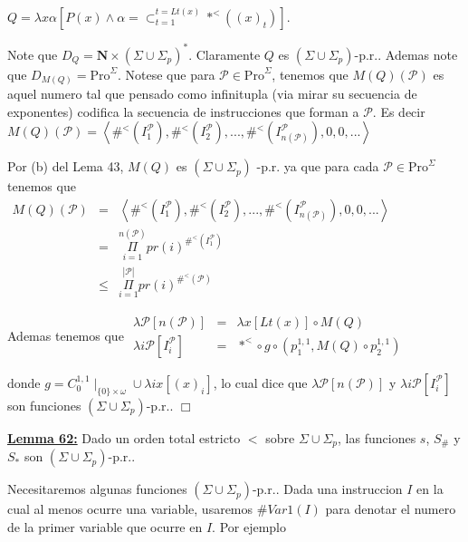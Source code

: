 \(\displaystyle Q=\lambda x\alpha \left[ P(x)\wedge \alpha =\subset _{t=1}^{t=Lt(x)}\ast ^{< }((x)_{t})\right] \text{.} \)

Note que \(D_{Q}=\mathbf{N}\times (\Sigma \cup \Sigma _{p})^{\ast }\). Claramente \(Q\) es \((\Sigma \cup \Sigma _{p})\)-p.r.. Ademas note que \( D_{M(Q)}=\mathrm{Pro}^{\Sigma }\). Notese que para \(\mathcal{P}\in \mathrm{Pro }^{\Sigma }\), tenemos que \(M(Q)(\mathcal{P})\) es aquel numero tal que pensado como infinitupla (via mirar su secuencia de exponentes) codifica la secuencia de instrucciones que forman a \(\mathcal{P}\). Es decir
\(\displaystyle M(Q)(\mathcal{P})=\left\langle \#^{< }(I_{1}^{\mathcal{P}}),\#^{< }(I_{2}^{ \mathcal{P}}),...,\#^{< }(I_{n(\mathcal{P})}^{\mathcal{P}}),0,0,...\right \rangle \)

Por (b) del Lema 43, \(M(Q)\) es \((\Sigma \cup \Sigma _{p})\) -p.r. ya que para cada \(\mathcal{P}\in \mathrm{Pro}^{\Sigma }\) tenemos que
\(\displaystyle \begin{array}{rcl} M(Q)(\mathcal{P}) & =& \left\langle \#^{< }(I_{1}^{\mathcal{P}}),\#^{< }(I_{2}^{ \mathcal{P}}),...,\#^{< }(I_{n(\mathcal{P})}^{\mathcal{P}}),0,0,...\right \rangle \\ & =& \underset{i=1}{\overset{n(\mathcal{P})}{\Pi }}pr(i)^{\#^{< }(I_{1}^{ \mathcal{P}})} \\ & \leq & \underset{i=1}{\overset{\left\vert \mathcal{P}\right\vert }{\Pi }} pr(i)^{\#^{< }(\mathcal{P})} \end{array} \)

Ademas tenemos que
\(\displaystyle \begin{array}{rcl} \lambda \mathcal{P}\left[ n(\mathcal{P})\right] & =& \lambda x\left[ Lt(x) \right] \circ M(Q) \\ \lambda i\mathcal{P}\left[ I_{i}^{\mathcal{P}}\right] & =& \ast ^{< }\circ g\circ \left( p_{1}^{1,1},M(Q)\circ p_{2}^{1,1}\right) \end{array} \)

donde \(g=C_{0}^{1,1}\mid _{\{0\}\times \omega }\cup \lambda ix\left[ (x)_{i} \right] \), lo cual dice que \(\lambda \mathcal{P}\left[ n(\mathcal{P})\right] \) y \(\lambda i\mathcal{P}\left[ I_{i}^{\mathcal{P}}\right] \) son funciones \( (\Sigma \cup \Sigma _{p})\)-p.r.. \(\Box\)


\textbf{\underline{Lemma 62:}} Dado un orden total estricto \( < \) sobre \(\Sigma \cup \Sigma _{p}\), las funciones \(s\), \(S_{\#}\) y \(S_{\ast } \) son \((\Sigma \cup \Sigma _{p})\)-p.r..

\PROOF Necesitaremos algunas funciones \((\Sigma \cup \Sigma _{p})\)-p.r.. Dada una instruccion \(I\) en la cual al menos ocurre una variable, usaremos \(\#Var1(I)\) para denotar el numero de la primer variable que ocurre en \(I\). Por ejemplo

